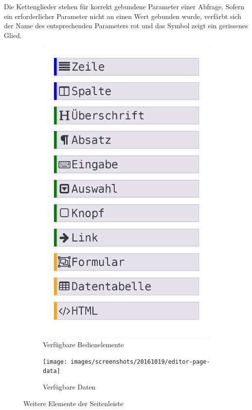 Die Kettenglieder stehen für korrekt gebundene Parameter einer Abfrage. Sofern ein erforderlicher Parameter nicht an einen Wert gebunden wurde, verfärbt sich der Name des entsprechenden Parameters rot und das Symbol zeigt ein gerissenes Glied.

\begin{figure}[h]
  \begin{subfigure}[b]{0.45\textwidth}
    \includegraphics[width=\textwidth]{images/screenshots/20161019/editor-page-widgets}
    \caption{Verfügbare Bedienelemente}
    \label{fig:sidebar-editor-widgets}
  \end{subfigure}\hfill
  \begin{subfigure}[b]{0.45\textwidth}
    \texttt{[image: images/screenshots/20161019/editor-page-data]}
    \caption{Verfügbare Daten}
    \label{fig:sidebar-editor-data}    
  \end{subfigure}
  \caption{Weitere Elemente der Seitenleiste}
  \label{fig:sidebar-widgets}
\end{figure}

